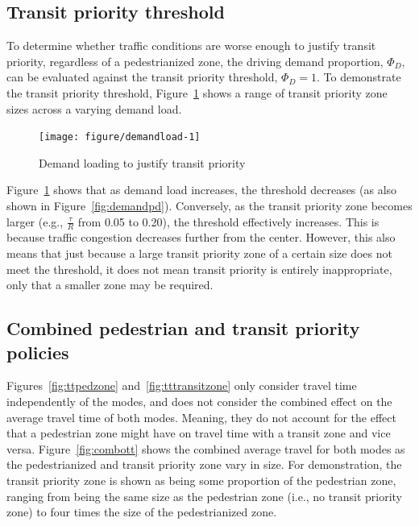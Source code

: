 \documentclass{elsarticle}\usepackage[]{graphicx}\usepackage[]{color}
\newenvironment{knitrout}{}{} %
\begin{document}
\subsection{Transit priority threshold}
To determine whether traffic conditions are worse enough to justify transit priority, regardless of a pedestrianized zone, the driving demand proportion, $\Phi_D$, can be evaluated against the transit priority threshold, $\Phi_D = 1$. To demonstrate the transit priority threshold, Figure~\ref{fig:demandload} shows a range of transit priority zone sizes across a varying demand load.

\begin{figure}[H]
    \centering
\begin{knitrout}
\color{fgcolor}
\texttt{[image: figure/demandload-1]} 
\end{knitrout}
    \caption{Demand loading to justify transit priority}
    \label{fig:demandload}
\end{figure}

Figure~\ref{fig:demandload} shows that as demand load increases, the threshold decreases (as also shown in Figure~\ref{fig:demandpd}). Conversely, as the transit priority zone becomes larger (e.g., $\frac{\tau}{R}$ from 0.05 to 0.20), the threshold effectively increases. This is because traffic congestion decreases further from the center. However, this also means that just because a large transit priority zone of a certain size does not meet the threshold, it does not mean transit priority is entirely inappropriate, only that a smaller zone may be required. 


\subsection{Combined pedestrian and transit priority policies}
Figures~\ref{fig:ttpedzone} and~\ref{fig:tttransitzone} only consider travel time independently of the modes, and does not consider the combined effect on the average travel time of both modes. Meaning, they do not account for the effect that a pedestrian zone might have on travel time with a transit zone and vice versa. Figure~\ref{fig:combott} shows the combined average travel for both modes as the pedestrianized and transit priority zone vary in size. For demonstration, the transit priority zone is shown as being some proportion of the pedestrian zone, ranging from being the same size as the pedestrian zone (i.e., no transit priority zone) to four times the size of the pedestrianized zone.
\end{document}
